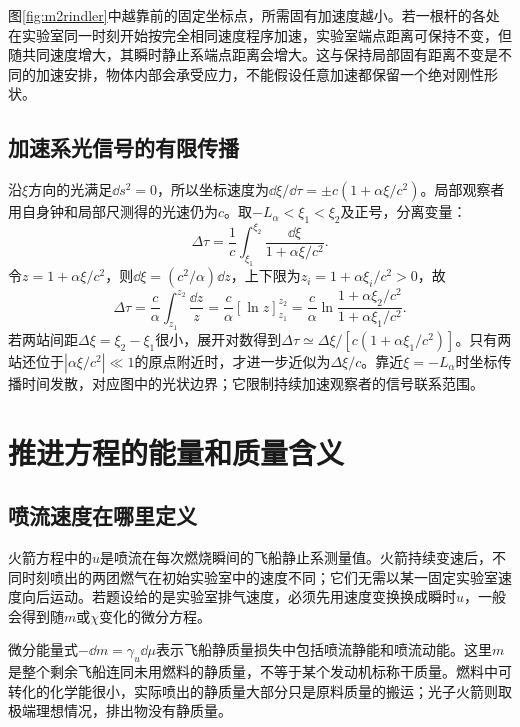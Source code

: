 图\ref{fig:m2rindler}中越靠前的固定坐标点，所需固有加速度越小。若一根杆的各处在实验室同一时刻开始按完全相同速度程序加速，实验室端点距离可保持不变，但随共同速度增大，其瞬时静止系端点距离会增大。这与保持局部固有距离不变是不同的加速安排，物体内部会承受应力，不能假设任意加速都保留一个绝对刚性形状。

\subsection{加速系光信号的有限传播}
沿$\xi$方向的光满足$\dd s^2=0$，所以坐标速度为$\dd\xi/\dd\tau=\pm c(1+\alpha\xi/c^2)$。局部观察者用自身钟和局部尺测得的光速仍为$c$。取$-L_\alpha<\xi_1<\xi_2$及正号，分离变量：
\[
 \Delta\tau=\frac1c\int_{\xi_1}^{\xi_2}
 \frac{\dd\xi}{1+\alpha\xi/c^2}.
\]
令$z=1+\alpha\xi/c^2$，则$\dd\xi=(c^2/\alpha)\dd z$，上下限为$z_i=1+\alpha\xi_i/c^2>0$，故
\[
 \Delta\tau=\frac c\alpha\int_{z_1}^{z_2}\frac{\dd z}z
 =\frac c\alpha[\ln z]_{z_1}^{z_2}
 =\frac c\alpha\ln\frac{1+\alpha\xi_2/c^2}{1+\alpha\xi_1/c^2}.
\]
若两站间距$\Delta\xi=\xi_2-\xi_1$很小，展开对数得到$\Delta\tau\simeq\Delta\xi/[c(1+\alpha\xi_1/c^2)]$。只有两站还位于$|\alpha\xi/c^2|\ll1$的原点附近时，才进一步近似为$\Delta\xi/c$。靠近$\xi=-L_\alpha$时坐标传播时间发散，对应图中的光状边界；它限制持续加速观察者的信号联系范围。

\section{推进方程的能量和质量含义}
\subsection{喷流速度在哪里定义}
火箭方程中的$u$是喷流在每次燃烧瞬间的飞船静止系测量值。火箭持续变速后，不同时刻喷出的两团燃气在初始实验室中的速度不同；它们无需以某一固定实验室速度向后运动。若题设给的是实验室排气速度，必须先用速度变换换成瞬时$u$，一般会得到随$m$或$\chi$变化的微分方程。

微分能量式$-\dd m=\gamma_u\dd\mu$表示飞船静质量损失中包括喷流静能和喷流动能。这里$m$是整个剩余飞船连同未用燃料的静质量，不等于某个发动机标称干质量。燃料中可转化的化学能很小，实际喷出的静质量大部分只是原料质量的搬运；光子火箭则取极端理想情况，排出物没有静质量。

